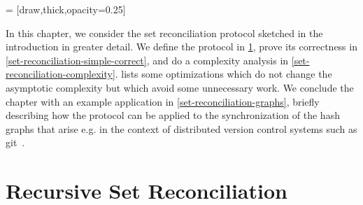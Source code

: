 
\newcommand{\examplefp}[1]{#1}
\newcommand{\fpa}[0]{\examplefp{144}}
\newcommand{\fpb}[0]{\examplefp{194}}
\newcommand{\fpc}[0]{\examplefp{240}}
\newcommand{\fpd}[0]{\examplefp{245}}
\newcommand{\fpe}[0]{\examplefp{76}}
\newcommand{\fpf}[0]{\examplefp{221}}
\newcommand{\fpg}[0]{\examplefp{224}}
\newcommand{\fph}[0]{\examplefp{65}}
\newcommand{\fpcd}[0]{\examplefp{229}}
\newcommand{\fpacd}[0]{\examplefp{117}}
\newcommand{\fpefgh}[0]{\examplefp{74}}
\newcommand{\fpbcdh}[0]{\examplefp{232}}
\newcommand{\fpzero}[0]{\examplefp{0}}

\newcommand{\examplea}[0]{a}
\newcommand{\exampleb}[0]{b}
\newcommand{\examplec}[0]{c}
\newcommand{\exampled}[0]{d}
\newcommand{\examplee}[0]{e}
\newcommand{\examplef}[0]{f}
\newcommand{\exampleg}[0]{g}
\newcommand{\exampleh}[0]{h}
\newcommand{\examplei}[0]{i}

\newcommand{\examplefpi}[3]{
  $\ifpmanual{#1}{#2}{\fp{#3}}$
}
\newcommand{\exampleiis}[3]{
\begin{tabular}{ c | c  | c }
{#1} & {#3} & {#2} \\ 
\end{tabular}
}




 = [draw,thick,opacity=0.25]

In this chapter, we consider the set reconciliation protocol sketched in the introduction in greater detail.
We define the protocol in \cref{set-reconciliation-def}, prove its correctness in \cref{set-reconciliation-simple-correct}, and do a complexity analysis in \cref{set-reconciliation-complexity}.   lists some optimizations which do not change the asymptotic complexity but which avoid some unnecessary work. We conclude the chapter with an example application in \cref{set-reconciliation-graphs}, briefly describing how the protocol can be applied to the synchronization of the hash graphs that arise e.g. in the context of distributed version control systems such as git~\cite{chacon2014pro}.

\section{Recursive Set Reconciliation}
\label{set-reconciliation-def}

